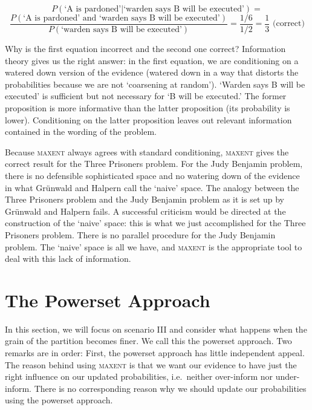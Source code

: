 \documentclass[smallextended]{svjour3}       %
\newcommand{\nias}{\noindent} %
\newcommand{\nial}{\noindent} %
\newcommand{\qnull}[1]{`#1'}
\begin{document}
\begin{displaymath}
  P(\mbox{`A is pardoned'}|\mbox{`warden says B will be
    executed'})=
\end{displaymath}
\begin{displaymath}
  \frac{P(\mbox{`A is pardoned' and `warden says B will
      be executed'})}{P(\mbox{`warden says B will be
      executed'})}=\frac{1/6}{1/2}=\frac{1}{3}\mbox{ (correct)}
\end{displaymath}

\nial Why is the first equation incorrect and the second one correct?
Information theory gives us the right answer: in the first equation,
we are conditioning on a watered down version of the evidence (watered
down in a way that distorts the probabilities because we are not
\qnull{coarsening at random}). \qnull{Warden says B will be executed}
is sufficient but not necessary for \qnull{B will be executed.} The
former proposition is more informative than the latter proposition
(its probability is lower). Conditioning on the latter proposition
leaves out relevant information contained in the wording of the
problem.

Because \textsc{maxent} always agrees with standard conditioning,
\textsc{maxent} gives the correct result for the Three Prisoners
problem. For the Judy Benjamin problem, there is no defensible
sophisticated space and no watering down of the evidence in what
Gr{\"u}nwald and Halpern call the \qnull{naive} space. The analogy
between the Three Prisoners problem and the Judy Benjamin problem as
it is set up by Gr{\"u}nwald and Halpern fails. A successful criticism
would be directed at the construction of the \qnull{naive} space: this
is what we just accomplished for the Three Prisoners problem. There is
no parallel procedure for the Judy Benjamin problem. The \qnull{naive}
space is all we have, and \textsc{maxent} is the appropriate tool to
deal with this lack of information.

\section{The Powerset Approach}
\label{sec:4}

\nias In this section, we will focus on scenario III and consider what
happens when the grain of the partition becomes finer. We call this
the powerset approach. Two remarks are in order: First, the powerset
approach has little independent appeal. The reason behind using
\textsc{maxent} is that we want our evidence to have just the right
influence on our updated probabilities, i.e.\ neither over-inform
nor under-inform. There is no corresponding reason why we should
update our probabilities using the powerset approach.
\end{document}
